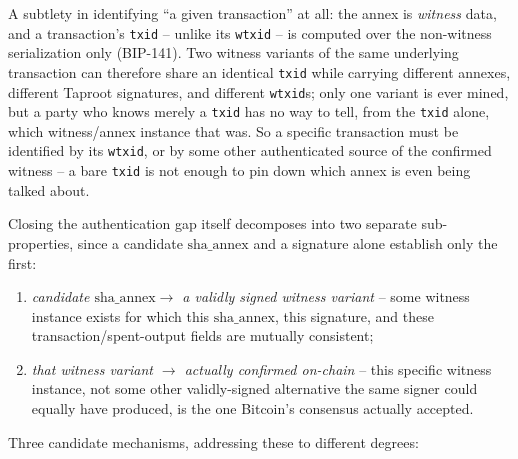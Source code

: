 A subtlety in identifying ``a given transaction'' at all: the annex is
\emph{witness} data, and a transaction's \texttt{txid} -- unlike its
\texttt{wtxid} -- is computed over the non-witness serialization only
(BIP-141). Two witness variants of the same underlying transaction can
therefore share an identical \texttt{txid} while carrying different
annexes, different Taproot signatures, and different \texttt{wtxid}s; only
one variant is ever mined, but a party who knows merely a \texttt{txid} has
no way to tell, from the \texttt{txid} alone, which witness/annex instance
that was. So a specific transaction must be identified by its
\texttt{wtxid}, or by some other authenticated source of the confirmed
witness -- a bare \texttt{txid} is not enough to pin down which annex is
even being talked about.

Closing the authentication gap itself decomposes into two separate
sub-properties, since a candidate $\mathrm{sha\_annex}$ and a signature
alone establish only the first:
\begin{enumerate}
\item \emph{candidate $\mathrm{sha\_annex} \to$ a validly signed witness
  variant} -- some witness instance exists for which this
  $\mathrm{sha\_annex}$, this signature, and these transaction/spent-output
  fields are mutually consistent;
\item \emph{that witness variant $\to$ actually confirmed on-chain} -- this
  specific witness instance, not some other validly-signed alternative the
  same signer could equally have produced, is the one Bitcoin's consensus
  actually accepted.
\end{enumerate}
Three candidate mechanisms, addressing these to different degrees:
